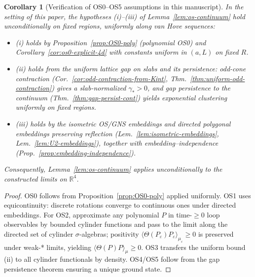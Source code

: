 \documentclass[11pt]{amsart}
\theoremstyle{plain}
\newtheorem{corollary}[theorem]{Corollary}
\theoremstyle{definition}
\theoremstyle{remark}
\begin{document}
\begin{corollary}[Verification of OS0--OS5 assumptions in this manuscript]\label{cor:os-assumptions-verified}
In the setting of this paper, the hypotheses (i)–(iii) of Lemma~\ref{lem:os-continuum} hold unconditionally on fixed regions, uniformly along van Hove sequences:
\begin{itemize}
  \item (i) holds by Proposition~\ref{prop:OS0-poly} (polynomial OS0) and Corollary~\ref{cor:os0-explicit-4d} with constants uniform in $(a,L)$ on fixed $R$.
  \item (ii) holds from the uniform lattice gap on slabs and its persistence: odd-cone contraction (Cor.~\ref{cor:odd-contraction-from-Kint}, Thm.~\ref{thm:uniform-odd-contraction}) gives a slab-normalized $\gamma_*>0$, and gap persistence to the continuum (Thm.~\ref{thm:gap-persist-cont}) yields exponential clustering uniformly on fixed regions.
  \item (iii) holds by the isometric OS/GNS embeddings and directed polygonal embeddings preserving reflection (Lem.~\ref{lem:isometric-embeddings}, Lem.~\ref{lem:U2-embeddings}), together with embedding–independence (Prop.~\ref{prop:embedding-independence}).
\end{itemize}
Consequently, Lemma~\ref{lem:os-continuum} applies unconditionally to the constructed limits on $\mathbb R^4$.
\end{corollary}
\begin{proof}
OS0 follows from Proposition~\ref{prop:OS0-poly} applied uniformly. OS1 uses equicontinuity: discrete rotations converge to continuous ones under directed embeddings. For OS2, approximate any polynomial $P$ in time-$\ge0$ loop observables by bounded cylinder functions and pass to the limit along the directed set of cylinder $\sigma$-algebras; positivity $\langle \Theta(P_\varepsilon) P_\varepsilon\rangle_{\mu_\varepsilon}\ge0$ is preserved under weak-* limits, yielding $\langle \Theta(P) P\rangle_\mu\ge0$. OS3 transfers the uniform bound (ii) to all cylinder functionals by density. OS4/OS5 follow from the gap persistence theorem ensuring a unique ground state.
\end{proof}
\end{document}
